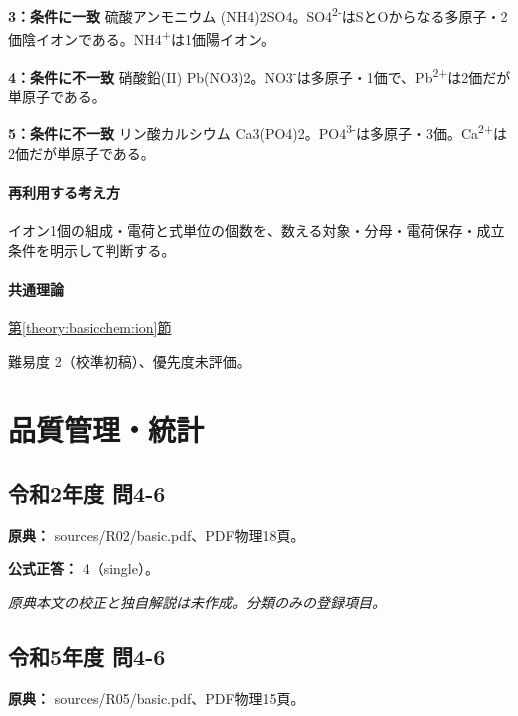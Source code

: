 \noindent\textbf{3：条件に一致} 硫酸アンモニウム (NH4)2SO4。SO4\textsuperscript{2-}はSとOからなる多原子・2価陰イオンである。NH4\textsuperscript{+}は1価陽イオン。\par

\noindent\textbf{4：条件に不一致} 硝酸鉛(II) Pb(NO3)2。NO3\textsuperscript{-}は多原子・1価で、Pb\textsuperscript{2+}は2価だが単原子である。\par

\noindent\textbf{5：条件に不一致} リン酸カルシウム Ca3(PO4)2。PO4\textsuperscript{3-}は多原子・3価。Ca\textsuperscript{2+}は2価だが単原子である。\par

\paragraph{再利用する考え方} イオン1個の組成・電荷と式単位の個数を、数える対象・分母・電荷保存・成立条件を明示して判断する。

\paragraph{共通理論} \hyperref[theory:basicchem:ion]{第\ref*{theory:basicchem:ion}節}

\par 難易度 2（校準初稿）、優先度未評価。

\section{品質管理・統計}

\subsection{令和2年度 問4-6}
\label{q:r02-reg-basic-4-6}

\noindent\textbf{原典：} sources/R02/basic.pdf、PDF物理18頁。

\textbf{公式正答：} 4（single）。

\par\textit{原典本文の校正と独自解説は未作成。分類のみの登録項目。}

\subsection{令和5年度 問4-6}
\label{q:r05-reg-basic-4-6}

\noindent\textbf{原典：} sources/R05/basic.pdf、PDF物理15頁。

